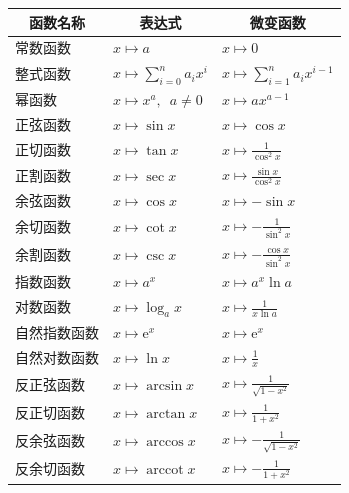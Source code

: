 \documentclass[12pt,UTF8]{ctexbook}
\newcommand{\arccot}{\operatorname{arccot}}
\theoremstyle{definition}
\theoremstyle{plain}
\begin{document}
\begin{appendix}
\begin{center}
    \renewcommand{\arraystretch}{2}
    \setlength{\extrarowheight}{-3pt}
    \begin{longtable}{|l|l|l|}
        \hline \multicolumn{1}{|c|}{\textbf{函数名称}} & \multicolumn{1}{c|}{\textbf{表达式}} & \multicolumn{1}{c|}{\textbf{微变函数}} \\ 
        \hline         
        常数函数 & $x\mapsto a$ & $x\mapsto 0$ \\  
        \hline
        整式函数 & $x\mapsto \sum_{i=0}^n a_i x^i$ & $x\mapsto \sum_{i=1}^n a_i x^{i-1}$ \\ 
        \hline
        幂函数 & $x\mapsto x^a, \,\,\, a\neq 0$ & $x\mapsto ax^{a-1}$ \\ 
        \hline
        正弦函数 & $x\mapsto \sin{x}$ & $x\mapsto \cos{x}$ \\ 
        \hline
        正切函数 & $x\mapsto \tan{x}$ & $x\mapsto \frac{1}{\cos^2{x}}$ \\
        \hline
        正割函数 & $x\mapsto \sec{x}$ & $x\mapsto \frac{\sin{x}}{\cos^2{x}}$ \\ 
        \hline
        余弦函数 & $x\mapsto \cos{x}$ & $x\mapsto -\sin{x}$ \\ 
        \hline
        余切函数 & $x\mapsto \cot{x}$ & $x\mapsto -\frac{1}{\sin^2{x}}$ \\ 
        \hline
        余割函数 & $x\mapsto \csc{x}$ & $x\mapsto -\frac{\cos{x}}{\sin^2{x}}$ \\
        \hline
        指数函数 & $x\mapsto a^x$ & $x\mapsto a^x \ln{a} $ \\ 
        \hline
        对数函数 & $x\mapsto \log_a{x}$ & $x\mapsto \frac{1}{x\ln{a}} $ \\
        \hline
        自然指数函数 & $x\mapsto \mathrm{e}^x$ & $x\mapsto \mathrm{e}^x $ \\ 
        \hline
        自然对数函数 & $x\mapsto \ln{x}$ & $x\mapsto \frac{1}{x} $ \\  
        \hline
        反正弦函数 & $x\mapsto \arcsin{x}$ & $x\mapsto \frac{1}{\sqrt{1 - x^2}}$ \\ 
        \hline
        反正切函数 & $x\mapsto \arctan{x}$ & $x\mapsto \frac{1}{1 + x^2}$ \\
        \hline
        反余弦函数 & $x\mapsto \arccos{x}$ & $x\mapsto -\frac{1}{\sqrt{1 - x^2}}$ \\ 
        \hline
        反余切函数 & $x\mapsto \arccot{x}$ & $x\mapsto -\frac{1}{1 + x^2}$ \\ 
        \hline
    \end{longtable}
\end{center}


\end{appendix}
\end{document}
